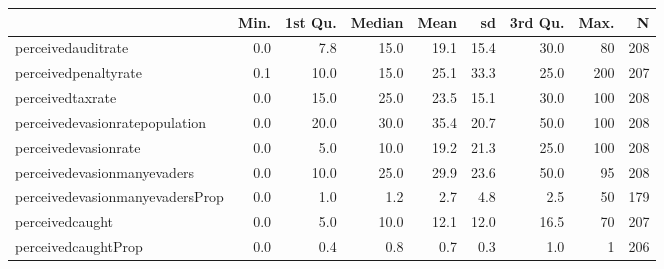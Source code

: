 \begin{table}[ht]
\centering
\begin{tabular}{lrrrrrrrr}
  \hline
 & Min. & 1st Qu. & Median & Mean & sd & 3rd Qu. & Max. & N \\ 
  \hline
perceivedauditrate & 0.0 & 7.8 & 15.0 & 19.1 & 15.4 & 30.0 & 80 & 208 \\ 
  perceivedpenaltyrate & 0.1 & 10.0 & 15.0 & 25.1 & 33.3 & 25.0 & 200 & 207 \\ 
  perceivedtaxrate & 0.0 & 15.0 & 25.0 & 23.5 & 15.1 & 30.0 & 100 & 208 \\ 
  perceivedevasionratepopulation & 0.0 & 20.0 & 30.0 & 35.4 & 20.7 & 50.0 & 100 & 208 \\ 
  perceivedevasionrate & 0.0 & 5.0 & 10.0 & 19.2 & 21.3 & 25.0 & 100 & 208 \\ 
  perceivedevasionmanyevaders & 0.0 & 10.0 & 25.0 & 29.9 & 23.6 & 50.0 & 95 & 208 \\ 
  perceivedevasionmanyevadersProp & 0.0 & 1.0 & 1.2 & 2.7 & 4.8 & 2.5 & 50 & 179 \\ 
  perceivedcaught & 0.0 & 5.0 & 10.0 & 12.1 & 12.0 & 16.5 & 70 & 207 \\ 
  perceivedcaughtProp & 0.0 & 0.4 & 0.8 & 0.7 & 0.3 & 1.0 &  1 & 206 \\ 
   \hline
\end{tabular}
\end{table}
